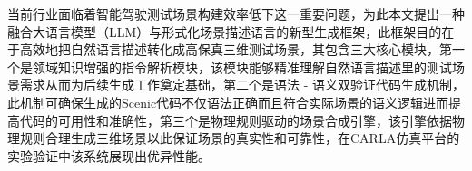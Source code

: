 \begin{abstractzh}
	
	当前行业面临着智能驾驶测试场景构建效率低下这一重要问题，为此本文提出一种融合大语言模型（LLM）与形式化场景描述语言的新型生成框架，此框架目的在于高效地把自然语言描述转化成高保真三维测试场景，其包含三大核心模块，第一个是领域知识增强的指令解析模块，该模块能够精准理解自然语言描述里的测试场景需求从而为后续生成工作奠定基础，第二个是语法 - 语义双验证代码生成机制，此机制可确保生成的Scenic代码不仅语法正确而且符合实际场景的语义逻辑进而提高代码的可用性和准确性，第三个是物理规则驱动的场景合成引擎，该引擎依据物理规则合理生成三维场景以此保证场景的真实性和可靠性，在CARLA仿真平台的实验验证中该系统展现出优异性能。
\end{abstractzh}